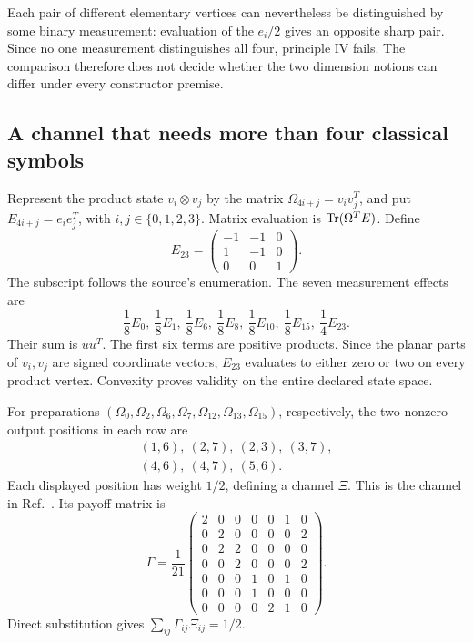 Each pair of different elementary vertices can nevertheless be distinguished by some binary measurement: evaluation of the $e_i/2$ gives an opposite sharp pair. Since no one measurement distinguishes all four, principle IV fails. The comparison therefore does not decide whether the two dimension notions can differ under every constructor premise.

\subsection{A channel that needs more than four classical symbols}
Represent the product state $v_i\otimes v_j$ by the matrix $\Omega_{4i+j}=v_iv_j^T$, and put $E_{4i+j}=e_ie_j^T$, with $i,j\in\{0,1,2,3\}$. Matrix evaluation is $\operatorname{Tr}(\Omega^TE)$. Define
\begin{equation}\label{eq:e23}
 E_{23}=\begin{pmatrix}-1&-1&0\\1&-1&0\\0&0&1\end{pmatrix}.
\end{equation}
The subscript follows the source's enumeration. The seven measurement effects are
\begin{equation}\label{eq:hs-measurement}
 \frac18 E_0,\ \frac18 E_1,\ \frac18 E_6,\ \frac18 E_8,
 \ \frac18 E_{10},\ \frac18 E_{15},\ \frac14 E_{23}.
\end{equation}
Their sum is $uu^T$. The first six terms are positive products. Since the planar parts of $v_i,v_j$ are signed coordinate vectors, $E_{23}$ evaluates to either zero or two on every product vertex. Convexity proves validity on the entire declared state space.

For preparations $(\Omega_0,\Omega_2,\Omega_6,\Omega_7,\Omega_{12},\Omega_{13},\Omega_{15})$, respectively, the two nonzero output positions in each row are
\begin{equation}\label{eq:hs-channel}
\begin{gathered}
 (1,6),\ (2,7),\ (2,3),\ (3,7),\\
 (4,6),\ (4,7),\ (5,6).
\end{gathered}
\end{equation}
Each displayed position has weight $1/2$, defining a channel $\Xi$. This is the channel in Ref.~\cite[Eq.~(4)]{hs}. Its payoff matrix is
\begin{equation}\label{eq:payoff}
 \Gamma=\frac1{21}\begin{pmatrix}
 2&0&0&0&0&1&0\\
 0&2&0&0&0&0&2\\
 0&2&2&0&0&0&0\\
 0&0&2&0&0&0&2\\
 0&0&0&1&0&1&0\\
 0&0&0&1&0&0&0\\
 0&0&0&0&2&1&0
 \end{pmatrix}.
\end{equation}
Direct substitution gives $\sum_{ij}\Gamma_{ij}\Xi_{ij}=1/2$.

